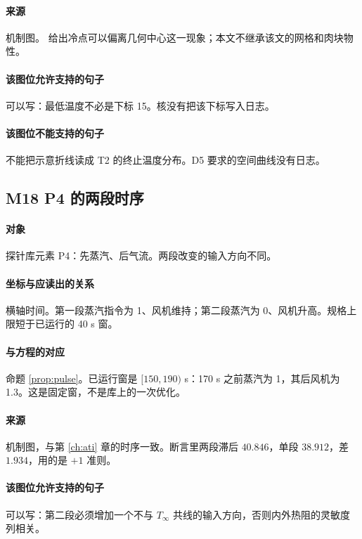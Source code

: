 \paragraph{来源}
机制图。\cite{feyissa2013} 给出冷点可以偏离几何中心这一现象；本文不继承该文的网格和肉块物性。

\paragraph{该图位允许支持的句子}
可以写：最低温度不必是下标 15。核没有把该下标写入日志。

\paragraph{该图位不能支持的句子}
不能把示意折线读成 T2 的终止温度分布。D5 要求的空间曲线没有日志。

\subsection{M18 P4 的两段时序}
\paragraph{对象}
探针库元素 P4：先蒸汽、后气流。两段改变的输入方向不同。

\paragraph{坐标与应读出的关系}
横轴时间。第一段蒸汽指令为 1、风机维持；第二段蒸汽为 0、风机升高。规格上限短于已运行的 40 s 窗。

\paragraph{与方程的对应}
命题 \ref{prop:pulse}。已运行窗是 $[150,190)$ s：170 s 之前蒸汽为 1，其后风机为 1.3。这是固定窗，不是库上的一次优化。

\paragraph{来源}
机制图，与第 \ref{ch:ati} 章的时序一致。断言里两段滞后 $40.846$，单段 $38.912$，差 $1.934$，用的是 $+1$ 准则。

\paragraph{该图位允许支持的句子}
可以写：第二段必须增加一个不与 $T_\infty$ 共线的输入方向，否则内外热阻的灵敏度列相关。

